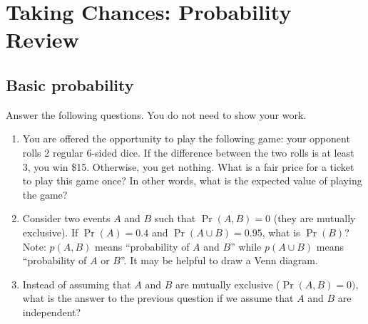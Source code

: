 \newpage

\section{Taking Chances: Probability Review}



\subsection{Basic probability}
Answer the following questions. You do not need to show your work.

\begin{enumerate}
    \item You are offered the opportunity to play the following game: your opponent rolls 2 regular 6-sided dice. If the difference between the two rolls is at least 3, you win \$15. Otherwise, you get nothing. What is a fair price for a ticket to play this game once? In other words, what is the expected value of playing the game?
    
    \item Consider two events $A$ and $B$ such that $\Pr(A, B)=0$ (they are mutually exclusive). If $\Pr(A) = 0.4$ and $\Pr(A \cup B) = 0.95$, what is $\Pr(B)$? Note: $p(A, B)$ means ``probability of $A$ and $B$'' while $p(A \cup B)$ means ``probability of $A$ or $B$''. It may be helpful to draw a Venn diagram.
    
    \item Instead of assuming that $A$ and $B$ are mutually exclusive ($\Pr(A,B) = 0)$, what is the answer to the previous question if we assume that $A$ and $B$ are independent?
\end{enumerate}



